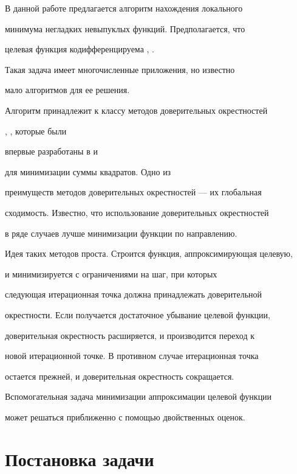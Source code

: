 В данной работе предлагается алгоритм нахождения локального 


минимума негладких невыпуклых функций. Предполагается, что


целевая функция кодифференцируема \cite{demrub}, \cite{demrub2}.


Такая задача имеет многочисленные приложения, но известно


мало алгоритмов для ее решения.





Алгоритм принадлежит к классу методов доверительных окрестностей


\cite{more}, \cite{powell}, которые были


впервые разработаны в \cite{lev} и 


\cite{marq} для минимизации суммы квадратов. Одно из


преимуществ методов доверительных окрестностей --- их глобальная


сходимость. Известно, что использование доверительных окрестностей


в ряде случаев лучше минимизации функции по направлению.





Идея таких методов проста. Строится функция, аппроксимирующая целевую,


и минимизируется с ограничениями на шаг, при которых 


следующая итерационная точка должна принадлежать доверительной


окрестности. Если получается достаточное убывание целевой функции,


доверительная окрестность расширяется, и производится переход к


новой итерационной точке. В противном случае итерационная точка


остается прежней, и доверительная окрестность сокращается.


Вспомогательная задача минимизации аппроксимации целевой функции


может решаться приближенно с помощью двойственных оценок.





\section{Постановка задачи}





